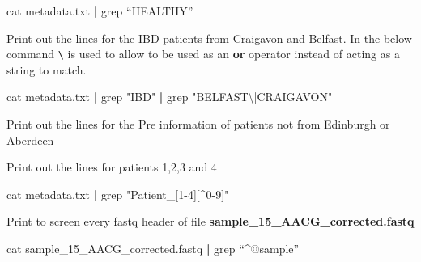 \documentclass[
  letterpaper,
  DIV=11,
  numbers=noendperiod]{scrreprt}
\newenvironment{Shaded}{\begin{snugshade}}{\end{snugshade}}
\newcommand{\AttributeTok}[1]{\textcolor[rgb]{0.40,0.45,0.13}{#1}}
\newcommand{\FunctionTok}[1]{\textcolor[rgb]{0.28,0.35,0.67}{#1}}
\newcommand{\KeywordTok}[1]{\textcolor[rgb]{0.00,0.23,0.31}{\textbf{#1}}}
\newcommand{\NormalTok}[1]{\textcolor[rgb]{0.00,0.23,0.31}{#1}}
\newcommand{\StringTok}[1]{\textcolor[rgb]{0.13,0.47,0.30}{#1}}
\begin{document}
\begin{Shaded}
\begin{Highlighting}[]
\FunctionTok{cat}\NormalTok{ metadata.txt }\KeywordTok{|} \FunctionTok{grep}\NormalTok{ “HEALTHY”}
\end{Highlighting}
\end{Shaded}

Print out the lines for the IBD patients from Craigavon and Belfast. In
the below command \texttt{\textbackslash{}} is used to allow
\texttt{\textbar{}} to be used as an \textbf{or} operator instead of
acting as a string to match.

\begin{Shaded}
\begin{Highlighting}[]
\FunctionTok{cat}\NormalTok{ metadata.txt }\KeywordTok{|} \FunctionTok{grep} \StringTok{"IBD"} \KeywordTok{|} \FunctionTok{grep} \StringTok{"BELFAST\textbackslash{}|CRAIGAVON"}
\end{Highlighting}
\end{Shaded}

Print out the lines for the Pre information of patients not from
Edinburgh or Aberdeen

\begin{Shaded}
\end{Shaded}

Print out the lines for patients 1,2,3 and 4

\begin{Shaded}
\begin{Highlighting}[]
\FunctionTok{cat}\NormalTok{ metadata.txt }\KeywordTok{|} \FunctionTok{grep} \StringTok{"Patient\_[1{-}4][\^{}0{-}9]"} 
\end{Highlighting}
\end{Shaded}

Print to screen every fastq header of file
\textbf{sample\_15\_AACG\_corrected.fastq}

\begin{Shaded}
\begin{Highlighting}[]
\FunctionTok{cat}\NormalTok{ sample\_15\_AACG\_corrected.fastq }\KeywordTok{|} \FunctionTok{grep}\NormalTok{ “\^{}@sample”}
\end{Highlighting}
\end{Shaded}
\end{document}
